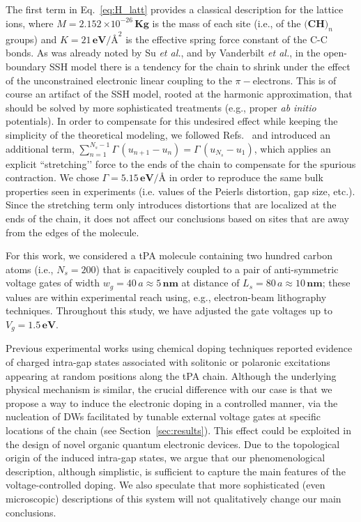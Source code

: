 \documentclass[10pt,a4paper]{article}
\begin{document}
The first term in Eq.~\ref{eq:H_latt} provides a classical description for the lattice ions, where ${M = 2.152} \, {\times 10^{-26} \, \textbf{Kg}}$ is the mass of each site (i.e., of the $\textbf{(CH)}_{n}$ groups) and ${K = 21 \, \textbf{eV}/\textbf{\AA}^{2}}$ is the effective spring force constant of the C-C bonds. As was already noted by Su \textit{et al.}\cite{Su80_Dynamics_of_solitons_in_PA}, and by Vanderbilt \textit{et al.}\cite{Vanderbilt80_Disorder_in_tPA}, in the open-boundary SSH model there is a tendency for the chain to shrink under the effect of the unconstrained electronic linear coupling to the $\pi-$electrons. This is of course an artifact of the SSH model, rooted at the harmonic approximation, that should be solved by more sophisticated treatments (e.g., proper \textit{ab initio} potentials). In order to compensate for this undesired effect while keeping the simplicity of the theoretical modeling, we followed Refs.~\cite{Su80_Dynamics_of_solitons_in_PA, Vanderbilt80_Disorder_in_tPA, Vos96_SSH_model_finite_length} and introduced an additional term, ${\sum_{n=1}^{N_{s}-1} \Gamma \, (u_{n+1} - u_{n}) = \Gamma \, (u_{N_{s}} - u_{1})}$, which applies an explicit ``stretching’’ force to the ends of the chain to compensate for the spurious contraction. We chose ${\Gamma = 5.15 \, \textbf{eV}/\textbf{\AA}}$ in order to reproduce the same bulk properties seen in experiments (i.e. values of the Peierls distortion, gap size, etc.). Since the stretching term only introduces distortions that are localized at the ends of the chain, it does not affect our conclusions based on sites that are away from the edges of the molecule. 

For this work, we considered a tPA molecule containing two hundred carbon atoms (i.e., ${N_{s} = 200}$) that is capacitively coupled to a pair of anti-symmetric voltage gates of width ${w_{g} = 40 \, a \approx 5 \, \textbf{nm}}$ at distance of ${L_{s} = 80 \, a \approx 10 \, \textbf{nm}}$; these values are within experimental reach using, e.g., electron-beam lithography techniques. Throughout this study, we have adjusted the gate voltages up to ${V_{g} = 1.5 \, \textbf{eV}}$.

Previous experimental works using chemical doping techniques reported evidence of charged intra-gap states associated with solitonic or polaronic excitations appearing at random positions along the tPA chain\cite{Heeger88_Solitons_in_conducting_polymers, Chiang77}. Although the underlying physical mechanism is similar, the crucial difference with our case is that we propose a way to induce the electronic doping in a controlled manner, via the nucleation of DWs facilitated by tunable external voltage gates at specific locations of the chain (see Section~\ref{sec:results}). This effect could be exploited in the design of novel organic quantum electronic devices. Due to the topological origin of the induced intra-gap states, we argue that our phenomenological description, although simplistic, is sufficient to capture the main features of the voltage-controlled doping. We also speculate that more sophisticated (even microscopic) descriptions of this system will not qualitatively change our main conclusions.
\end{document}
